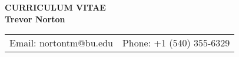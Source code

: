 
\thispagestyle{empty}

\begin{center}
	{{\bf CURRICULUM VITAE}}\\
	\vspace{0.25in}
	{{\bf Trevor Norton}} 
\end{center}



\begin{center}
	\begin{tabular}{l l}
		Email: nortontm@bu.edu & Phone: +1 (540) 355-6329 \\
	\end{tabular}


\vspace{0.25em}



\end{center}
